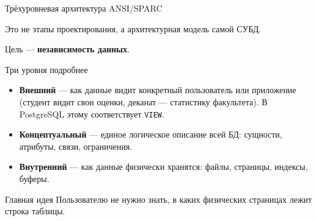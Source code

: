 \documentclass[aspectratio=169]{beamer}
\begin{document}

\begin{frame}{Трёхуровневая архитектура ANSI/SPARC}

Это не этапы проектирования,
а архитектурная модель самой СУБД.

\begin{center}
\end{center}

\begin{center}
Цель — \textbf{независимость данных}.
\end{center}

\end{frame}


\begin{frame}{Три уровня подробнее}

\begin{itemize}
  \item \textbf{Внешний} — как данные видит конкретный
        пользователь или приложение (студент видит свои
        оценки, деканат — статистику факультета).
        В PostgreSQL этому соответствует \texttt{VIEW}.
  \item \textbf{Концептуальный} — единое логическое описание
        всей БД: сущности, атрибуты, связи, ограничения.
  \item \textbf{Внутренний} — как данные физически хранятся:
        файлы, страницы, индексы, буферы.
\end{itemize}

\vspace{0.3cm}

\begin{alertblock}{Главная идея}
Пользователю не нужно знать,
в каких физических страницах лежит строка таблицы.
\end{alertblock}

\end{frame}
\end{document}
